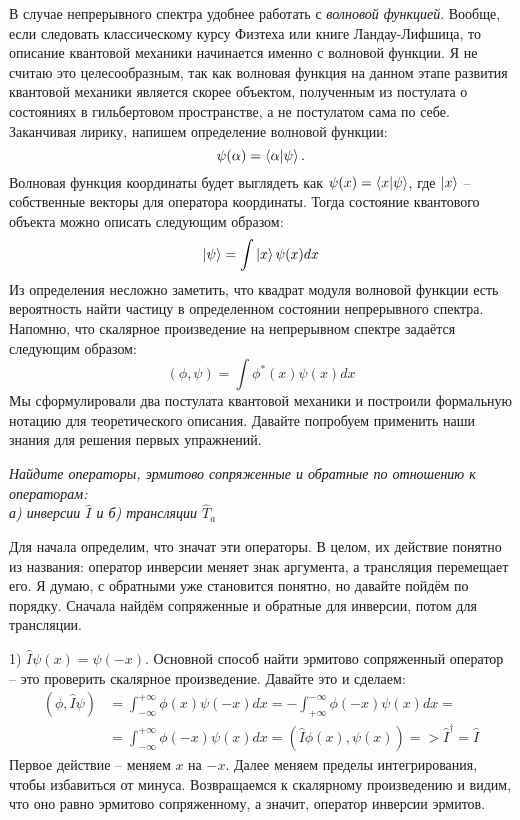 В случае непрерывного спектра удобнее работать с \textit{волновой функцией}. Вообще, если следовать классическому курсу Физтеха или книге Ландау-Лифшица, то описание квантовой механики начинается именно с волновой функции. Я не считаю это целесообразным, так как волновая функция на данном этапе развития квантовой механики является скорее объектом, полученным из постулата о состояниях в гильбертовом пространстве, а не постулатом сама по себе. Заканчивая лирику, напишем определение волновой функции:
\[
\psi(\alpha) = \bra{\alpha}\ket{\psi}.
\]
Волновая функция координаты будет выглядеть как $\psi(x) = \bra{x}\ket{\psi}$, где $\ket{x}$ -- собственные векторы для оператора координаты. Тогда состояние квантового объекта можно описать следующим образом:
\[
\ket{\psi} = \int\ket{x}\psi(x)dx
\]
Из определения несложно заметить, что квадрат модуля волновой функции есть вероятность найти частицу в определенном состоянии непрерывного спектра. Напомню, что скалярное произведение на непрерывном спектре задаётся следующим образом:
\[
(\phi, \psi) = \int \phi^*(x) \psi(x) dx
\]
\newpage
Мы сформулировали два постулата квантовой механики и построили формальную нотацию для теоретического описания. Давайте попробуем применить наши знания для решения первых упражнений.
\begin{center}
\textit{Найдите операторы, эрмитово сопряженные и обратные по отношению к операторам:\\ а) инверсии $\hat I$ и б) трансляции $\hat T_a$}
\end{center}
Для начала определим, что значат эти операторы. В целом, их действие понятно из названия: оператор инверсии меняет знак аргумента, а трансляция перемещает его. Я думаю, с обратными уже становится понятно, но давайте пойдём по порядку. Сначала найдём сопряженные и обратные для инверсии, потом для трансляции.

1) $\hat I \psi(x) = \psi(-x)$. Основной способ найти эрмитово сопряженный оператор -- это проверить скалярное произведение. Давайте это и сделаем:
\begin{align*}
    (\phi, \hat{I}\psi)  &= \int^{+\infty}_{-\infty} \phi(x) \psi(-x) dx = -\int^{-\infty}_{+\infty} \phi(-x) \psi(x) dx = \\ 
    &= \int^{+\infty}_{-\infty}\phi(-x) \psi(x) dx = (\hat{I}\phi(x), \psi(x)) => \hat I^{\dagger} = \hat I
\end{align*}
Первое действие -- меняем $x$ на $-x$. Далее меняем пределы интегрирования, чтобы избавиться от минуса. Возвращаемся к скалярному произведению и видим, что оно равно эрмитово сопряженному, а значит, оператор инверсии эрмитов.

